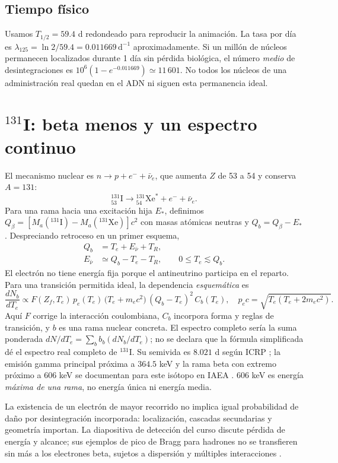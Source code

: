 \documentclass[11pt,a4paper]{article}
\newcommand{\I}{\mathrm I}\newcommand{\Te}{\mathrm{Te}}\newcommand{\Xe}{\mathrm{Xe}}
\begin{document}
\subsection{Tiempo físico}
Usamos $T_{1/2}=59.4$ d redondeado para reproducir la animación. La tasa por día es $\lambda_{125}=\ln2/59.4=0.011669\,\mathrm{d}^{-1}$ aproximadamente. Si un millón de núcleos permanecen localizados durante 1 día sin pérdida biológica, el número \emph{medio} de desintegraciones es $10^6(1-e^{-0.011669})\simeq11\,601$. No todos los núcleos de una administración real quedan en el ADN ni siguen esta permanencia ideal.

\section{$^{131}$I: beta menos y un espectro continuo}
El mecanismo nuclear es $n\to p+e^-+\bar\nu_e$, que aumenta $Z$ de 53 a 54 y conserva $A=131$:
\begin{equation}{}^{131}_{53}\I\longrightarrow{}^{131}_{54}\Xe^*+e^-+\bar\nu_e .\end{equation}
Para una rama hacia una excitación hija $E_*$, definimos $Q_\beta=[M_a(^{131}\I)-M_a(^{131}\Xe)]c^2$ con masas atómicas neutras y $Q_b=Q_\beta-E_*$. Despreciando retroceso en un primer esquema,
\begin{align}Q_b&=T_e+E_{\bar\nu}+T_R,\\ E_{\bar\nu}&\simeq Q_b-T_e-T_R,\qquad 0\leq T_e\lesssim Q_b.\end{align}
El electrón no tiene energía fija porque el antineutrino participa en el reparto. Para una transición permitida ideal, la dependencia \emph{esquemática} es
\begin{equation}\frac{dN_b}{dT_e}\propto F(Z_f,T_e)\,p_e(T_e)\,\bigl(T_e+m_ec^2\bigr)\,(Q_b-T_e)^2\,C_b(T_e),\quad p_ec=\sqrt{T_e(T_e+2m_ec^2)}.\end{equation}
Aquí $F$ corrige la interacción coulombiana, $C_b$ incorpora forma y reglas de transición, y $b$ es una rama nuclear concreta. El espectro completo sería la suma ponderada $dN/dT_e=\sum_b b_b(dN_b/dT_e)$; no se declara que la fórmula simplificada dé el espectro real completo de $^{131}$I. Su semivida es $8.021$ d según ICRP \cite{icrp}; la emisión gamma principal próxima a $364.5$ keV y la rama beta con extremo próximo a $606$ keV se documentan para este isótopo en IAEA \cite{iaea131}. $606$ keV es energía \emph{máxima de una rama}, no energía única ni energía media.

La existencia de un electrón de mayor recorrido no implica igual probabilidad de daño por desintegración incorporada: localización, cascadas secundarias y geometría importan. La diapositiva de detección del curso discute pérdida de energía y alcance; sus ejemplos de pico de Bragg para hadrones no se transfieren sin más a los electrones beta, sujetos a dispersión y múltiples interacciones \cite{deteccion}.
\end{document}
